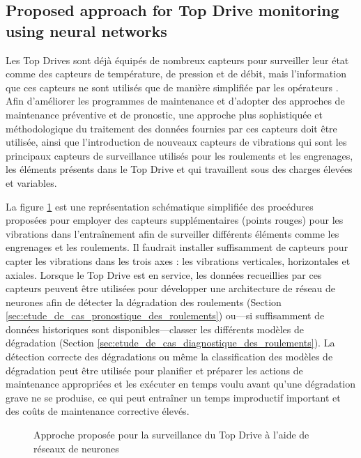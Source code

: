 \subsection{Proposed approach for Top Drive monitoring using neural networks}%
\label{sub:proposed_approach_for_top_drive_monitoring_using_neural_networks}

Les Top Drives sont déjà équipés de nombreux capteurs pour surveiller leur état comme des capteurs de température, de pression et de débit, mais l'information que ces capteurs ne sont utilisés que de manière simplifiée par les opérateurs \cite{Pournazari2016}. Afin d'améliorer les programmes de maintenance et d'adopter des approches de maintenance préventive et de pronostic, une approche plus sophistiquée et méthodologique du traitement des données fournies par ces capteurs doit être utilisée, ainsi que l'introduction de nouveaux capteurs de vibrations qui sont les principaux capteurs de surveillance utilisés pour les roulements et les engrenages, les éléments présents dans le Top Drive et qui travaillent sous des charges élevées et variables.

La figure \ref{fig:topdrive-drive-sensors} est une représentation schématique simplifiée des procédures proposées pour employer des capteurs supplémentaires (points rouges) pour les vibrations dans l'entraînement afin de surveiller différents éléments comme les engrenages et les roulements. Il faudrait installer suffisamment de capteurs pour capter les vibrations dans les trois axes : les vibrations verticales, horizontales et axiales. Lorsque le Top Drive est en service, les données recueillies par ces capteurs peuvent être utilisées pour développer une architecture de réseau de neurones afin de détecter la dégradation des roulements (Section \ref{sec:etude_de_cas_pronostique_des_roulements}) ou---si suffisamment de données historiques sont disponibles---classer les différents modèles de dégradation (Section \ref{sec:etude_de_cas_diagnostique_des_roulements}). La détection correcte des dégradations ou même la classification des modèles de dégradation peut être utilisée pour planifier et préparer les actions de maintenance appropriées et les exécuter en temps voulu avant qu'une dégradation grave ne se produise, ce qui peut entraîner un temps improductif important et des coûts de maintenance corrective élevés.


\begin{figure}[H]
	\centering
	
	\caption{Approche proposée pour la surveillance du Top Drive à l'aide de réseaux de neurones}%
	\label{fig:topdrive-drive-sensors}
\end{figure}

